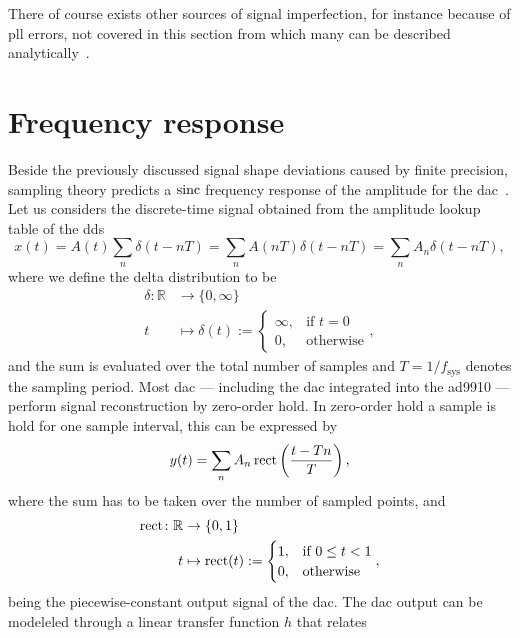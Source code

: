 There of course exists other sources of signal imperfection, for instance
because of \gls{pll} errors, not covered in this section from which many can
be described analytically~\cite{Goldberg1994}. 

\section{Frequency response}

Beside the previously discussed signal shape deviations caused by finite
precision, sampling theory predicts a $\operatorname{sinc}$ frequency response of
the amplitude for the \gls{dac}~\cite{Oppenheim1997}. Let us considers the
discrete-time signal obtained from the amplitude lookup table of the \gls{dds}
\begin{equation}
  x(t)
  =A(t)\sum_n \delta(t-nT)
  =\sum_n A(nT)\delta(t-nT)
  =\sum_n A_n\delta(t-nT)
  \label{eq:signal_sampled},
\end{equation}
where we define the delta distribution to be
\begin{align}
  \delta\colon\mathbb{R} &\to \{0,\infty\}\\
  t &\mapsto \delta(t):=
  \begin{cases}
    \infty, & \text{if }t=0\\
    0, & \text{otherwise}
  \end{cases}
  \label{eq:delta},
\end{align}
and the sum is evaluated over the total number of samples and
$T=1/f_\text{sys}$ denotes the sampling period. Most \gls{dac} --- including
the \gls{dac} integrated into the \gls{ad9910} --- perform signal
reconstruction by zero-order hold. In zero-order hold a sample is hold for
one sample interval, this can be expressed by
\begin{equation}
  y(t)
  =
  \sum_n A_n\operatorname{rect}\left(\frac{t-Tn}{T}\right)
  \label{eq:signal_reconstructed},
\end{equation}
where the sum has to be taken over the number of sampled points, and
\begin{align}
  \operatorname{rect}\colon\mathbb{R} &\to \{0,1\}\\
  t &\mapsto \operatorname{rect}(t):=
  \begin{cases}
    1, & \text{if }0\leq t<1\\
    0, & \text{otherwise}
  \end{cases}
  \label{eq:rect},
\end{align}
being the piecewise-constant output signal of the \gls{dac}. The \gls{dac}
output can be modeleled through a linear transfer function $h$ that relates
